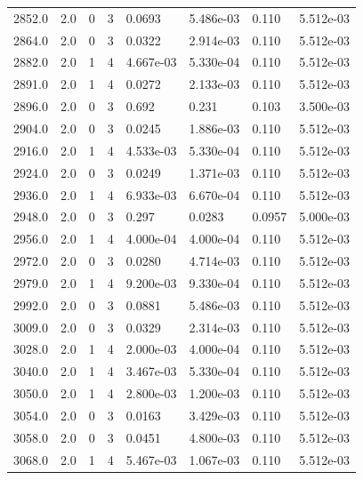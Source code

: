 \documentclass[preview]{standalone}
\begin{document}
{{{{{{{{\begin{tabular}{L{1.2cm}C{1.2cm} C{0.3cm}C{0.5cm} C{1.4cm}C{1.4cm} C{1.4cm}C{1.4cm}}
  2852.0  &   2.0  & 0     &  3 &  0.0693  & 5.486e-03  & 0.110 &  5.512e-03   \\ 
  2864.0  &   2.0  & 0     &  3 &  0.0322  & 2.914e-03  & 0.110 &  5.512e-03   \\ 
  2882.0  &   2.0  & 1     &  4 &  4.667e-03  & 5.330e-04  & 0.110 &  5.512e-03   \\ 
  2891.0  &   2.0  & 1     &  4 &  0.0272  & 2.133e-03  & 0.110 &  5.512e-03   \\ 
  2896.0  &   2.0  & 0     &  3 &  0.692  & 0.231  & 0.103 &  3.500e-03   \\ 
  2904.0  &   2.0  & 0     &  3 &  0.0245  & 1.886e-03  & 0.110 &  5.512e-03   \\ 
  2916.0  &   2.0  & 1     &  4 &  4.533e-03  & 5.330e-04  & 0.110 &  5.512e-03   \\ 
  2924.0  &   2.0  & 0     &  3 &  0.0249  & 1.371e-03  & 0.110 &  5.512e-03   \\ 
  2936.0  &   2.0  & 1     &  4 &  6.933e-03  & 6.670e-04  & 0.110 &  5.512e-03   \\ 
  2948.0  &   2.0  & 0     &  3 &  0.297  & 0.0283  & 0.0957 &  5.000e-03   \\ 
  2956.0  &   2.0  & 1     &  4 &  4.000e-04  & 4.000e-04  & 0.110 &  5.512e-03   \\ 
  2972.0  &   2.0  & 0     &  3 &  0.0280  & 4.714e-03  & 0.110 &  5.512e-03   \\ 
  2979.0  &   2.0  & 1     &  4 &  9.200e-03  & 9.330e-04  & 0.110 &  5.512e-03   \\ 
  2992.0  &   2.0  & 0     &  3 &  0.0881  & 5.486e-03  & 0.110 &  5.512e-03   \\ 
  3009.0  &   2.0  & 0     &  3 &  0.0329  & 2.314e-03  & 0.110 &  5.512e-03   \\ 
  3028.0  &   2.0  & 1     &  4 &  2.000e-03  & 4.000e-04  & 0.110 &  5.512e-03   \\ 
  3040.0  &   2.0  & 1     &  4 &  3.467e-03  & 5.330e-04  & 0.110 &  5.512e-03   \\ 
  3050.0  &   2.0  & 1     &  4 &  2.800e-03  & 1.200e-03  & 0.110 &  5.512e-03   \\ 
  3054.0  &   2.0  & 0     &  3 &  0.0163  & 3.429e-03  & 0.110 &  5.512e-03   \\ 
  3058.0  &   2.0  & 0     &  3 &  0.0451  & 4.800e-03  & 0.110 &  5.512e-03   \\ 
  3068.0  &   2.0  & 1     &  4 &  5.467e-03  & 1.067e-03  & 0.110 &  5.512e-03   \\ 

\end{tabular}}}}}}}}}
\end{document}
